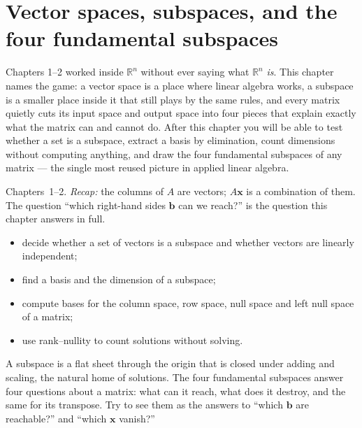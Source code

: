 \chapter{Vector spaces, subspaces, and the four fundamental subspaces}\label{ch:spaces}

Chapters 1--2 worked inside $\mathbb{R}^n$ without ever saying what $\mathbb{R}^n$ \emph{is}. This chapter names the game: a vector space is a place where linear algebra works, a subspace is a smaller place inside it that still plays by the same rules, and every matrix quietly cuts its input space and output space into four pieces that explain exactly what the matrix can and cannot do. After this chapter you will be able to test whether a set is a subspace, extract a basis by elimination, count dimensions without computing anything, and draw the four fundamental subspaces of any matrix — the single most reused picture in applied linear algebra.

\begin{rulebox}
Chapters~1--2. \emph{Recap:} the columns of $A$ are vectors; $A\mathbf x$ is a combination of them. The question ``which right-hand sides $\mathbf b$ can we reach?'' is the question this chapter answers in full.
\end{rulebox}
\begin{wins}
\begin{itemize}
\item decide whether a set of vectors is a subspace and whether vectors are linearly independent;
\item find a basis and the dimension of a subspace;
\item compute bases for the column space, row space, null space and left null space of a matrix;
\item use rank--nullity to count solutions without solving.
\end{itemize}
\end{wins}
\begin{principle}
A subspace is a flat sheet through the origin that is closed under adding and scaling, the natural home of solutions. The four fundamental subspaces answer four questions about a matrix: what can it reach, what does it destroy, and the same for its transpose. Try to see them as the answers to ``which $\mathbf b$ are reachable?'' and ``which $\mathbf x$ vanish?''
\end{principle}

